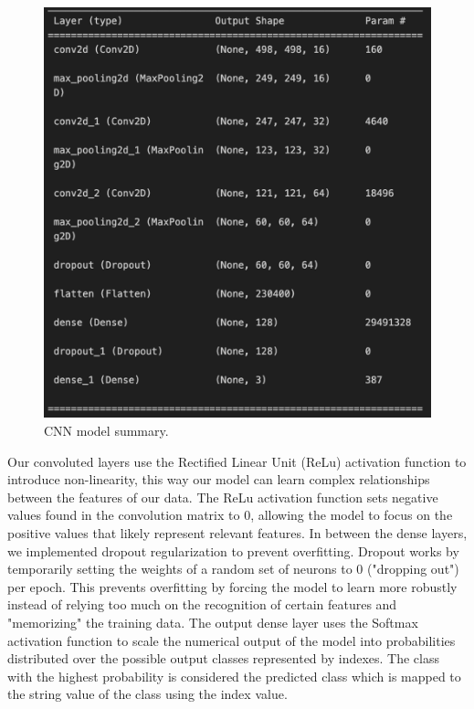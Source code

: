 \begin{figure}[h]
	\centering
	\includegraphics[scale=0.5]{CNN_structure}
	\caption{CNN model summary.}
	\label{fig:figure1}
\end{figure}

Our convoluted layers use the Rectified Linear Unit (ReLu) activation function to introduce non-linearity, this way our model can learn complex relationships between the features of our data. The ReLu activation function sets negative values found in the convolution matrix to 0, allowing the model to focus on the positive values that likely represent relevant features. In between the dense layers, we implemented dropout regularization to prevent overfitting. Dropout works by temporarily setting the weights of a random set of neurons to 0 ("dropping out") per epoch. This prevents overfitting by forcing the model to learn more robustly instead of relying too much on the recognition of certain features and "memorizing" the training data. The output dense layer uses the Softmax activation function to scale the numerical output of the model into probabilities distributed over the possible output classes represented by indexes. The class with the highest probability is considered the predicted class which is mapped to the string value of the class using the index value.

